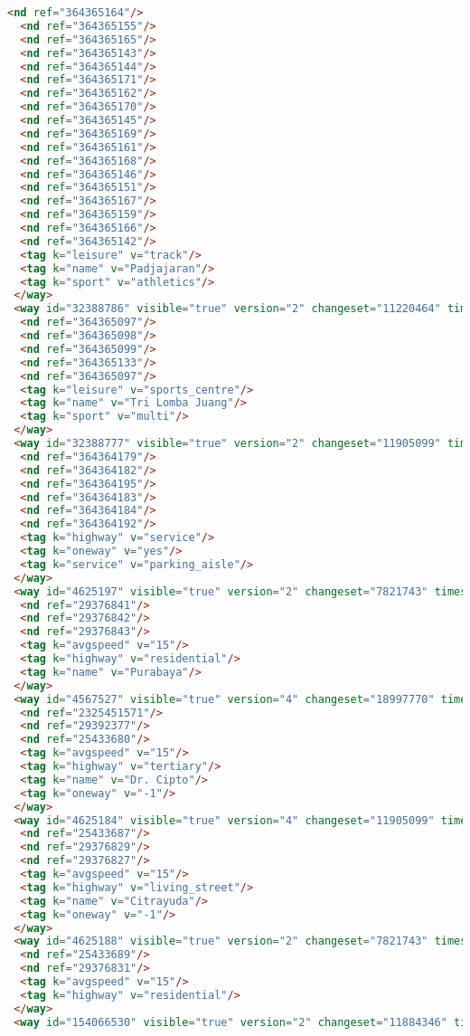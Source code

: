 \begin{lstlisting}[language=HTML,basicstyle=\tiny,caption=bandung1.xml]
  <nd ref="364365164"/>
  <nd ref="364365155"/>
  <nd ref="364365165"/>
  <nd ref="364365143"/>
  <nd ref="364365144"/>
  <nd ref="364365171"/>
  <nd ref="364365162"/>
  <nd ref="364365170"/>
  <nd ref="364365145"/>
  <nd ref="364365169"/>
  <nd ref="364365161"/>
  <nd ref="364365168"/>
  <nd ref="364365146"/>
  <nd ref="364365151"/>
  <nd ref="364365167"/>
  <nd ref="364365159"/>
  <nd ref="364365166"/>
  <nd ref="364365142"/>
  <tag k="leisure" v="track"/>
  <tag k="name" v="Padjajaran"/>
  <tag k="sport" v="athletics"/>
 </way>
 <way id="32388786" visible="true" version="2" changeset="11220464" timestamp="2012-04-08T02:49:11Z" user="andryono" uid="643030">
  <nd ref="364365097"/>
  <nd ref="364365098"/>
  <nd ref="364365099"/>
  <nd ref="364365133"/>
  <nd ref="364365097"/>
  <tag k="leisure" v="sports_centre"/>
  <tag k="name" v="Tri Lomba Juang"/>
  <tag k="sport" v="multi"/>
 </way>
 <way id="32388777" visible="true" version="2" changeset="11905099" timestamp="2012-06-15T14:05:59Z" user="andryono" uid="643030">
  <nd ref="364364179"/>
  <nd ref="364364182"/>
  <nd ref="364364195"/>
  <nd ref="364364183"/>
  <nd ref="364364184"/>
  <nd ref="364364192"/>
  <tag k="highway" v="service"/>
  <tag k="oneway" v="yes"/>
  <tag k="service" v="parking_aisle"/>
 </way>
 <way id="4625197" visible="true" version="2" changeset="7821743" timestamp="2011-04-10T11:14:24Z" user="evo2mind" uid="234610">
  <nd ref="29376841"/>
  <nd ref="29376842"/>
  <nd ref="29376843"/>
  <tag k="avgspeed" v="15"/>
  <tag k="highway" v="residential"/>
  <tag k="name" v="Purabaya"/>
 </way>
 <way id="4567527" visible="true" version="4" changeset="18997770" timestamp="2013-11-19T17:08:37Z" user="ubanovic" uid="1784103">
  <nd ref="2325451571"/>
  <nd ref="29392377"/>
  <nd ref="25433680"/>
  <tag k="avgspeed" v="15"/>
  <tag k="highway" v="tertiary"/>
  <tag k="name" v="Dr. Cipto"/>
  <tag k="oneway" v="-1"/>
 </way>
 <way id="4625184" visible="true" version="4" changeset="11905099" timestamp="2012-06-15T14:05:58Z" user="andryono" uid="643030">
  <nd ref="25433687"/>
  <nd ref="29376829"/>
  <nd ref="29376827"/>
  <tag k="avgspeed" v="15"/>
  <tag k="highway" v="living_street"/>
  <tag k="name" v="Citrayuda"/>
  <tag k="oneway" v="-1"/>
 </way>
 <way id="4625188" visible="true" version="2" changeset="7821743" timestamp="2011-04-10T11:12:21Z" user="evo2mind" uid="234610">
  <nd ref="25433689"/>
  <nd ref="29376831"/>
  <tag k="avgspeed" v="15"/>
  <tag k="highway" v="residential"/>
 </way>
 <way id="154066530" visible="true" version="2" changeset="11884346" timestamp="2012-06-13T12:22:04Z" user="andryono" uid="643030">

\end{lstlisting}
